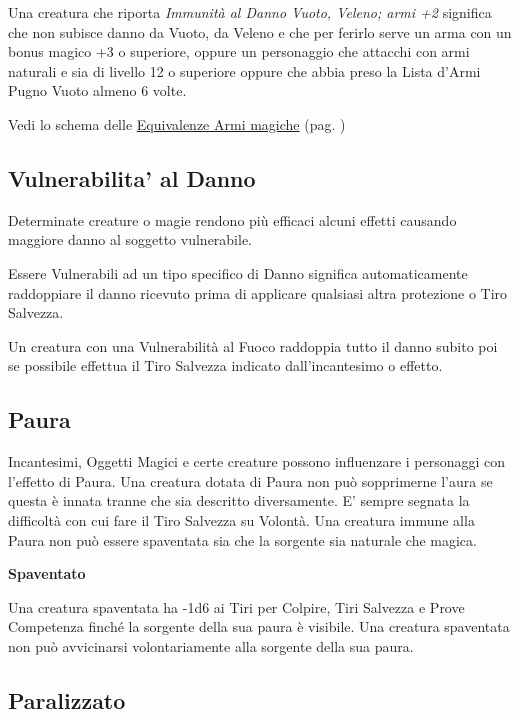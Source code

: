 \begin{multicols}{2}
Una creatura che riporta \emph{Immunità al Danno Vuoto, Veleno; armi +2} significa che non subisce danno da Vuoto, da Veleno e che per ferirlo serve un arma con un bonus magico +3 o superiore, oppure un personaggio che attacchi con armi naturali e sia di livello 12 o superiore oppure che abbia preso la Lista d'Armi Pugno Vuoto almeno 6 volte. 

Vedi lo schema delle \hyperlink{equivalenzaarmimagiche}{Equivalenze Armi magiche} (pag. \pageref{equivalenzaarmimagiche})

\subsection{Vulnerabilita' al Danno}\label{vulnerabilitadanno}

Determinate creature o magie rendono più efficaci alcuni effetti causando maggiore danno al soggetto vulnerabile.

Essere Vulnerabili ad un tipo specifico di Danno significa automaticamente raddoppiare il danno ricevuto prima di applicare qualsiasi altra protezione o Tiro Salvezza.

Un creatura con una Vulnerabilità al Fuoco raddoppia tutto il danno subito poi se possibile effettua il Tiro Salvezza indicato dall'incantesimo o effetto.

\subsection{Paura}\label{paura}

Incantesimi, Oggetti Magici e certe creature possono influenzare i personaggi con l'effetto di Paura. Una creatura dotata di Paura non può sopprimerne l'aura se questa è innata tranne che sia descritto diversamente. E' sempre segnata la difficoltà con cui fare il Tiro Salvezza su Volontà. Una creatura immune alla Paura non può essere spaventata sia che la sorgente sia naturale che magica.

\textbf{Spaventato}\label{spaventato}

Una creatura spaventata ha -1d6 ai Tiri per Colpire, Tiri Salvezza e Prove Competenza finché la sorgente della sua paura è visibile. Una creatura spaventata non può avvicinarsi volontariamente alla sorgente della sua paura.

\subsection{Paralizzato}\label{paralizzato}


\end{multicols}
